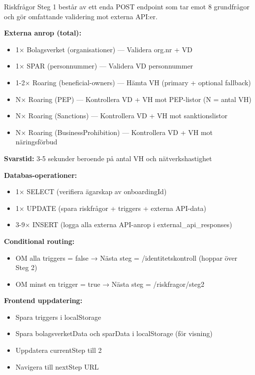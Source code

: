 \documentclass[12pt,a4paper]{article}
\begin{document}
Riskfrågor Steg 1 består av ett enda POST endpoint som tar emot 8 grundfrågor och gör omfattande validering mot externa API:er.

\textbf{Externa anrop (total):}
\begin{itemize}[noitemsep]
  \item 1× Bolagsverket (organisationer) — Validera org.nr + VD
  \item 1× SPAR (personnummer) — Validera VD personnummer
  \item 1-2× Roaring (beneficial-owners) — Hämta VH (primary + optional fallback)
  \item N× Roaring (PEP) — Kontrollera VD + VH mot PEP-listor (N = antal VH)
  \item N× Roaring (Sanctions) — Kontrollera VD + VH mot sanktionslistor
  \item N× Roaring (BusinessProhibition) — Kontrollera VD + VH mot näringsförbud
\end{itemize}

\textbf{Svarstid:} 3-5 sekunder beroende på antal VH och nätverkshastighet

\textbf{Databas-operationer:}
\begin{itemize}[noitemsep]
  \item 1× SELECT (verifiera ägarskap av onboardingId)
  \item 1× UPDATE (spara riskfrågor + triggers + externa API-data)
  \item 3-9× INSERT (logga alla externa API-anrop i external\_api\_responses)
\end{itemize}

\textbf{Conditional routing:}
\begin{itemize}[noitemsep]
  \item OM alla triggers = false → Nästa steg = /identitetskontroll (hoppar över Steg 2)
  \item OM minst en trigger = true → Nästa steg = /riskfragor/steg2
\end{itemize}

\textbf{Frontend uppdatering:}
\begin{itemize}[noitemsep]
  \item Spara triggers i localStorage
  \item Spara bolagsverketData och sparData i localStorage (för visning)
  \item Uppdatera currentStep till 2
  \item Navigera till nextStep URL
\end{itemize}
\end{document}
